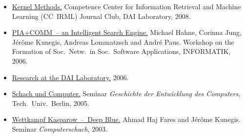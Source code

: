 \documentclass[line,mm]{res}
\newcounter{y}
\newcommand{\talknumber}{T\arabic{y}\stepcounter{y}}
\begin{document}
\begin{resume}
\begin{itemize}
  \item[{[\talknumber]}]
    \href{https://github.com/kunegis/pdfs/blob/master/kunegis:kernels-club.presentation.pdf}{Kernel Methods.}
    Competence Center for Information Retrieval and Machine Learning (CC~IRML) Journal Club, DAI Laboratory, 2008. 
  \item[{[\talknumber]}] 
    \href{https://github.com/kunegis/pdfs/blob/master/hahne:gradualisiertes-communitymodell.presentation.pdf}{PIA+COMM~--
      an Intelligent Search Engine.} 
    Michael Hahne, Corinna Jung, Jérôme Kunegis, Andreas Lommatzsch and
    André Paus. 
    Workshop on the Formation of Soc.\ Netw.\ in Soc.\ Software
    Applications, INFORMATIK, 2006. 
  \item[{[\talknumber]}]
    \href{https://github.com/kunegis/pdfs/blob/master/kunegis:research-dai.presentation.pdf}{Research at the DAI Laboratory.}
    2006.
  \item[{[\talknumber]}]
    \href{https://www.slideshare.net/kunegis/schach-und-computer}{Schach und Computer.}
    Seminar \emph{Geschichte der Entwicklung des Computers}, Tech.\ Univ.\ Berlin, 2005.
  \item[{[\talknumber]}]
    \href{https://github.com/kunegis/pdfs/blob/master/kunegis:kasparow-deep-blue.presentation.pdf}{Wettkampf Kasparow~--\ Deep Blue.}
    Ahmad Haj Fares and Jérôme Kunegis.
    Seminar \emph{Computerschach}, 2003. 
\end{itemize}


\end{resume}
\end{document}
